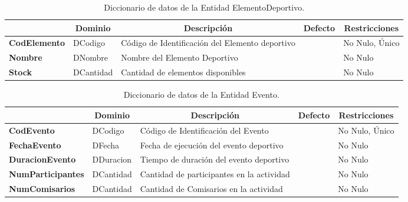 \begin{table}[H]
\centering
\caption{Diccionario de datos de la Entidad ElementoDeportivo.}
\label{tab-Dicc-14}
\begin{tabular}{>{\bfseries}m{4.0cm}>{}m{3.0cm}>{}m{6.0cm}>{}m{5.0cm}>{}m{2.0cm}}
\toprule
\multicolumn{1}{c}{\textbf{Atributo}} & \multicolumn{1}{c}{\textbf{Dominio}} & \multicolumn{1}{c}{\textbf{Descripción}} & \multicolumn{1}{c}{\textbf{Defecto}} & \multicolumn{1}{c}{\textbf{Restricciones}} \\ \midrule
CodElemento	&	DCodigo	&	Código de Identificación del Elemento deportivo	&		&	No Nulo, Único\\
Nombre	&	DNombre	&	Nombre del Elemento Deportivo	&		&	No Nulo\\
Stock	&	DCantidad	&	Cantidad de elementos disponibles	&		&	No Nulo\\\bottomrule
\end{tabular}
\end{table}

\begin{table}[H]
\centering
\caption{Diccionario de datos de la Entidad Evento.}
\label{tab-Dicc-15}
\begin{tabular}{>{\bfseries}m{4.0cm}>{}m{3.0cm}>{}m{6.0cm}>{}m{5.0cm}>{}m{2.0cm}}
\toprule
\multicolumn{1}{c}{\textbf{Atributo}} & \multicolumn{1}{c}{\textbf{Dominio}} & \multicolumn{1}{c}{\textbf{Descripción}} & \multicolumn{1}{c}{\textbf{Defecto}} & \multicolumn{1}{c}{\textbf{Restricciones}} \\ \midrule
CodEvento	&	DCodigo	&	Código de Identificación del Evento	&		&	No Nulo, Único\\
FechaEvento	&	DFecha	&	Fecha de ejecución del evento deportivo	&		&	No Nulo\\
DuracionEvento	&	DDuracion	&	Tiempo de duración del evento deportivo	&		&	No Nulo\\
NumParticipantes	&	DCantidad	&	Cantidad de participantes en la actividad	&		&	No Nulo\\
NumComisarios	&	DCantidad	&	Cantidad de Comisarios en la actividad	&		&	No Nulo\\\bottomrule
\end{tabular}
\end{table}

